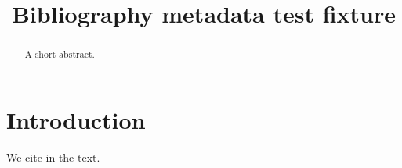\title{Bibliography metadata test fixture}
\begin{abstract}
A short abstract.\end{abstract}
\section{Introduction}
We cite \citep{good-ref,bad-year-ref,bad-doi-ref,missing-fields-ref} in the text.

